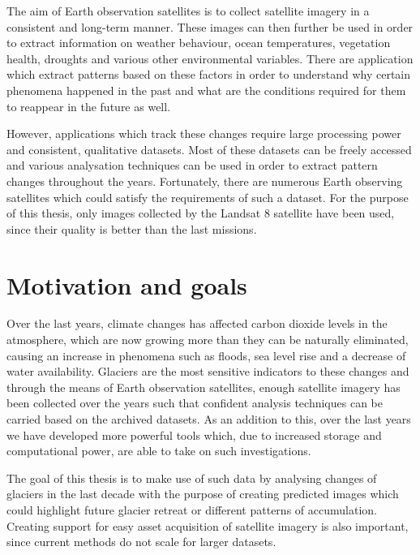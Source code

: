 \documentclass[12pt, a4paper]{report}
\begin{document}
	\par The aim of Earth observation satellites is to collect satellite imagery in a consistent and long-term manner. These images can then further be used in order to extract information on weather behaviour, ocean temperatures, vegetation health, droughts and various other environmental variables. There are application which extract patterns based on these factors in order to understand why certain phenomena happened in the past and what are the conditions required for them to reappear in the future as well. 
	
	\par However, applications which track these changes require large processing power and consistent, qualitative datasets. Most of these datasets can be freely accessed and various analysation techniques can be used in order to extract pattern changes throughout the years. Fortunately, there are numerous Earth observing satellites which could satisfy the requirements of such a dataset. For the purpose of this thesis, only images collected by the Landsat 8 satellite have been used, since their quality is better than the last missions.
	
	\section{Motivation and goals}
	
	\par Over the last years, climate changes has affected carbon dioxide levels in the atmosphere, which are now growing more than they can be naturally eliminated, causing an increase in  phenomena such as floods, sea level rise and a decrease of water availability. Glaciers are the most sensitive indicators to these changes and through the means of Earth observation satellites, enough satellite imagery has been collected over the years such that confident analysis techniques can be carried based on the archived datasets. As an addition to this, over the last years we have developed more powerful tools which, due to increased storage and computational power, are able to take on such investigations.

	\par The goal of this thesis is to make use of such data by analysing changes of glaciers in the last decade with the purpose of creating predicted images which could highlight future glacier retreat or different patterns of accumulation. Creating support for easy asset acquisition of satellite imagery is also important, since current methods do not scale for larger datasets.
\end{document}
